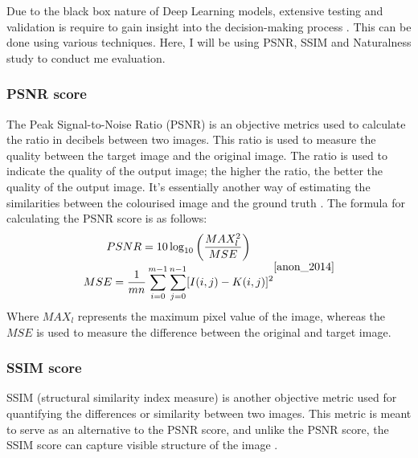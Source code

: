 Due to the black box nature of Deep Learning models, extensive testing and validation is require to gain insight into the decision-making process \cite{electronics10050593}. This can be done using various techniques. Here, I will be using PSNR, SSIM and Naturalness study to conduct me evaluation.

\subsubsection*{PSNR score}
The Peak Signal-to-Noise Ratio (PSNR) is an objective metrics used to calculate the ratio in decibels between two images. This ratio is used to measure the quality between the target image and the original image. The ratio is used to indicate the quality of the output image; the higher the ratio, the better the quality of the output image. It's essentially another way of estimating the similarities between the colourised image and the ground truth \cite{Chauhan2018}. The formula for calculating the PSNR score is as follows:
\begin{equation}
\begin{gathered}
P S N R=10 \log _{10}\left(\frac{M A X_{l}^{2}}{M S E}\right) \\
M S E=\frac{1}{m n} \sum_{i=0}^{m-1} \sum_{j=0}^{n-1}[I(i, j)-K(i, j)]^{2} 
\end{gathered}
\cite{anon_2014}
\end{equation}
Where \(M A X_{l}\) represents the maximum pixel value of the image, whereas the \(M S E\) is used to measure the difference between the original and target image.


\subsubsection*{SSIM score}
SSIM (structural similarity index measure) is another objective metric used for quantifying the differences or similarity between two images. This metric is meant to serve as an alternative to the PSNR score, and unlike the PSNR score, the SSIM score can capture visible structure of the image \cite{1284395}.

